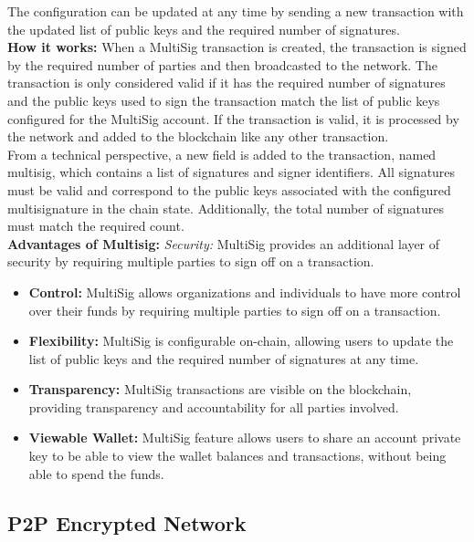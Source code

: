 \documentclass[10pt,a4paper,twocolumn]{article}
\begin{document}
The configuration can be updated at any time by sending a new transaction with the updated list of public keys and the required number of signatures.\\

\textbf{How it works:} When a MultiSig transaction is created, the transaction is signed by the required number of parties and then broadcasted to the network. The transaction is only considered valid if it has the required number of signatures and the public keys used to sign the transaction match the list of public keys configured for the MultiSig account. If the transaction is valid, it is processed by the network and added to the blockchain like any other transaction.\\

From a technical perspective, a new field is added to the transaction, named multisig, which contains a list of signatures and signer identifiers. All signatures must be valid and correspond to the public keys associated with the configured multisignature in the chain state. Additionally, the total number of signatures must match the required count.\\

\textbf{Advantages of Multisig:} \textit{Security:} MultiSig provides an additional layer of security by requiring multiple parties to sign off on a transaction. 
\begin{itemize}
\item \textbf{Control:} MultiSig allows organizations and individuals to have more control over their funds by requiring multiple parties to sign off on a transaction. 
\item \textbf{Flexibility:} MultiSig is configurable on-chain, allowing users to update the list of public keys and the required number of signatures at any time. 
\item \textbf{Transparency:} MultiSig transactions are visible on the blockchain, providing transparency and accountability for all parties involved. 
\item \textbf{Viewable Wallet:} MultiSig feature allows users to share an account private key to be able to view the wallet balances and transactions, without being able to spend the funds.\\
\end{itemize}
\subsection{P2P Encrypted Network}
\end{document}
